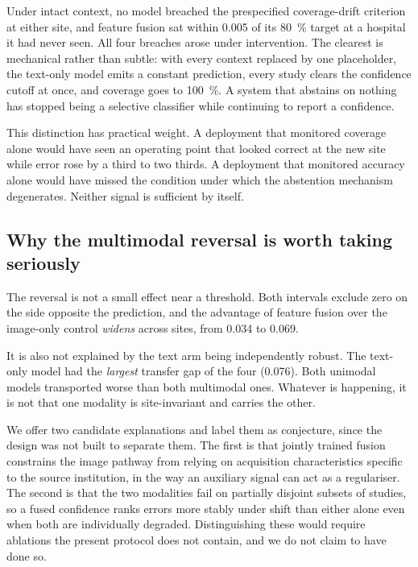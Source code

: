 Under intact context, no model breached the prespecified coverage-drift
criterion at either site, and feature fusion sat within \num{0.005} of its
\SI{80}{\percent} target at a hospital it had never seen. All four breaches
arose under intervention. The clearest is mechanical rather than subtle: with
every context replaced by one placeholder, the text-only model emits a constant
prediction, every study clears the confidence cutoff at once, and coverage goes
to \SI{100}{\percent}. A system that abstains on nothing has stopped being a
selective classifier while continuing to report a confidence.

This distinction has practical weight. A deployment that monitored coverage
alone would have seen an operating point that looked correct at the new site
while error rose by a third to two thirds. A deployment that monitored accuracy
alone would have missed the condition under which the abstention mechanism
degenerates. Neither signal is sufficient by itself.

\subsection{Why the multimodal reversal is worth taking seriously}

The reversal is not a small effect near a threshold. Both intervals exclude zero
on the side opposite the prediction, and the advantage of feature fusion over
the image-only control \emph{widens} across sites, from \num{0.034} to
\num{0.069}.

It is also not explained by the text arm being independently robust. The
text-only model had the \emph{largest} transfer gap of the four
(\num{+0.076}). Both unimodal models transported worse than both multimodal
ones. Whatever is happening, it is not that one modality is site-invariant and
carries the other.

We offer two candidate explanations and label them as conjecture, since the
design was not built to separate them. The first is that jointly trained fusion
constrains the image pathway from relying on acquisition characteristics
specific to the source institution, in the way an auxiliary signal can act as a
regulariser. The second is that the two modalities fail on partially disjoint
subsets of studies, so a fused confidence ranks errors more stably under shift
than either alone even when both are individually degraded. Distinguishing these
would require ablations the present protocol does not contain, and we do not
claim to have done so.

